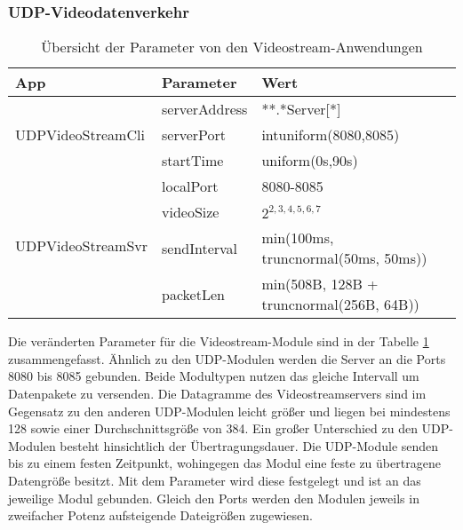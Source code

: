 \subsubsection{UDP-Videodatenverkehr}
\begin{table}[ht]
	\centering
	\begin{tabularx}{\textwidth}{|l|l|X|}
		\hline
		\rowcolor{Gainsboro!60}
		App      & Parameter     & Wert                                     \\ \hline
		\multirow{3}{*}{UDPVideoStreamCli} & serverAddress & **.*Server[*]                            \\ \cline{2-3}
		                                   & serverPort    & intuniform(8080,8085)                    \\ \cline{2-3}
		                                   & startTime     & uniform(0s,90s)                          \\ \hline
		\multirow{4}{*}{UDPVideoStreamSvr} & localPort     & 8080-8085                                \\ \cline{2-3}
		                                   & videoSize     & $2^{2,3,4,5,6,7}$                        \\ \cline{2-3}
		                                   & sendInterval  & min(100ms, truncnormal(50ms, 50ms))      \\ \cline{2-3}
		                                   & packetLen     & min(508B, 128B + truncnormal(256B, 64B)) \\ \hline
	\end{tabularx}
	\caption{Übersicht der Parameter von den Videostream-Anwendungen}
	\label{tab:videoModule}
\end{table}
Die veränderten Parameter für die Videostream-Module sind in der Tabelle \ref{tab:videoModule} zusammengefasst. Ähnlich zu den UDP-Modulen werden die Server an die Ports 8080 bis 8085 gebunden. Beide Modultypen nutzen das gleiche Intervall um Datenpakete zu versenden. Die Datagramme des Videostreamservers sind im Gegensatz zu den anderen UDP-Modulen leicht größer und liegen bei mindestens \SI{128}{\byte} sowie einer Durchschnittsgröße von \SI{384}{\byte}. Ein großer Unterschied zu den UDP-Modulen besteht hinsichtlich der Übertragungsdauer. Die UDP-Module senden bis zu einem festen Zeitpunkt, wohingegen das Modul  eine feste zu übertragene Datengröße besitzt. Mit dem Parameter  wird diese festgelegt und ist an das jeweilige Modul gebunden. Gleich den Ports werden den Modulen jeweils in zweifacher Potenz aufsteigende Dateigrößen zugewiesen.


